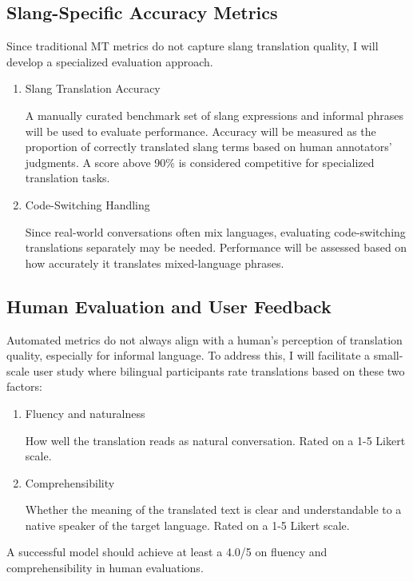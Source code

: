 \documentclass[10pt,twocolumn]{article}
\begin{document}
\subsection{Slang-Specific Accuracy Metrics}

Since traditional MT metrics do not capture slang translation quality, I will develop a specialized evaluation approach.

\begin{enumerate}
    \item Slang Translation Accuracy

A manually curated benchmark set of slang expressions and informal phrases will be used to evaluate performance. Accuracy will be measured as the proportion of correctly translated slang terms based on human annotators’ judgments. A score above 90\% is considered competitive for specialized translation tasks. 

    \item Code-Switching Handling

Since real-world conversations often mix languages, evaluating code-switching translations separately may be needed. Performance will be assessed based on how accurately it translates mixed-language phrases.

\end{enumerate}

\subsection{Human Evaluation and User Feedback}

Automated metrics do not always align with a human’s perception of translation quality, especially for informal language. To address this, I will facilitate a small-scale user study where bilingual participants rate translations based on these two factors:

\begin{enumerate}
    \item Fluency and naturalness

How well the translation reads as natural conversation. Rated on a 1-5 Likert scale.

    \item Comprehensibility

Whether the meaning of the translated text is clear and understandable to a native speaker of the target language. Rated on a 1-5 Likert scale.

\end{enumerate}
A successful model should achieve at least a 4.0/5 on fluency and comprehensibility in human evaluations.

\printbibliography

\appendix

\clearpage

\onecolumn
\end{document}
